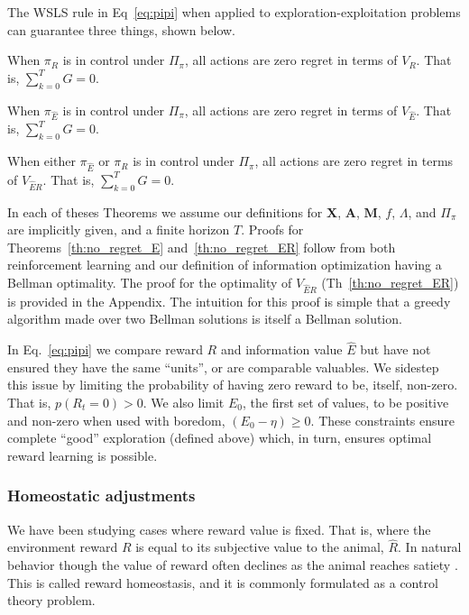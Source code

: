 The WSLS rule in Eq~\ref{eq:pipi} when applied to exploration-exploitation problems can guarantee three things, shown below. 

\begin{theorem}
	\label{th:no_regret_R}
	When $\pi_R$ is in control under $\Pi_{\pi}$, all actions are zero regret in terms of $V_R$. That is, $\sum_{k=0}^{T} G = 0$.
\end{theorem}

\begin{theorem}
	\label{th:no_regret_E}
	When $\pi_{\hat E}$ is in control under $\Pi_{\pi}$, all actions are zero regret in terms of $V_{\hat E}$. That is, $\sum_{k=0}^{T} G = 0$.
\end{theorem}

\begin{theorem}
	\label{th:no_regret_ER}
	When either $\pi_{\hat E}$ or $\pi_R$ is in control under $\Pi_{\pi}$, all actions are zero regret in terms of $V_{\hat{E}R}$. That is, $\sum_{k=0}^{T} G = 0$.
\end{theorem}

In each of theses Theorems we assume our definitions for $\mathbf{X}$, $\mathbf{A}$, $\mathbf{M}$, $f$, $\Lambda$, and $\Pi_{\pi}$ are implicitly given, and a finite horizon $T$. Proofs for Theorems~\ref{th:no_regret_E} and~\ref{th:no_regret_ER} follow from both reinforcement learning and our definition of information optimization having a Bellman optimality. The proof for the optimality of $V_{\hat{E}R}$ (Th~\ref{th:no_regret_ER}) is provided in the Appendix. The intuition for this proof is simple that a greedy algorithm made over two Bellman solutions is itself a Bellman solution.

In Eq.~\ref{eq:pipi} we compare reward $R$ and information value $\hat E$ but have not ensured they have the same ``units'', or are comparable valuables. We sidestep this issue by limiting the probability of having zero reward to be, itself, non-zero. That is, $p(R_t=0) > 0$. We also limit $E_0$, the first set of values, to be positive and non-zero when used with boredom, $(E_0 - \eta) \geq 0$. These constraints ensure complete ``good'' exploration (defined above) which, in turn, ensures optimal reward learning is possible.



\subsubsection*{Homeostatic adjustments}
We have been studying cases where reward value is fixed. That is, where the environment reward $R$ is equal to its subjective value to the animal, $\hat R$. In natural behavior though the value of reward often declines as the animal reaches satiety \cite{Keramati2014,Juechems2019,Munch2020}. This is called reward homeostasis, and it is commonly formulated as a control theory problem.


